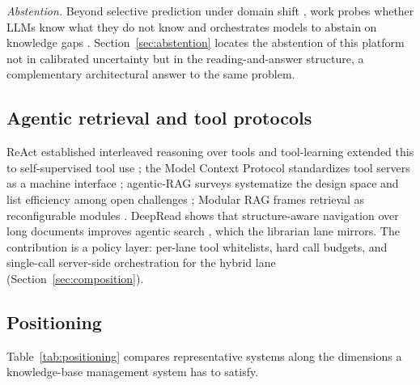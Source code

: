 \emph{Abstention.} Beyond selective prediction under domain shift
\citep{kamath}, work probes whether LLMs know what they do not know
\citep{yin-knowwhat} and orchestrates models to abstain on knowledge gaps
\citep{feng-abstain}. Section~\ref{sec:abstention} locates the abstention of
this platform not in calibrated uncertainty but in the reading-and-answer
structure, a complementary architectural answer to the same problem.

\subsection{Agentic retrieval and tool protocols}
ReAct established interleaved reasoning over tools \citep{react-yao} and
tool-learning extended this to self-supervised tool use \citep{toolformer}; the
Model Context
Protocol standardizes tool servers as a machine interface \citep{mcp};
agentic-RAG surveys systematize the design space and list efficiency among open
challenges \citep{singh-agentic-rag}; Modular RAG frames retrieval as
reconfigurable modules \citep{modular-rag}. DeepRead shows that structure-aware
navigation over long documents improves agentic search \citep{deepread}, which
the librarian lane mirrors. The contribution is a policy layer: per-lane tool
whitelists, hard call budgets, and single-call server-side orchestration for the
hybrid lane (Section~\ref{sec:composition}).

\subsection{Positioning}
Table~\ref{tab:positioning} compares representative systems along the
dimensions a knowledge-base management system has to satisfy.

